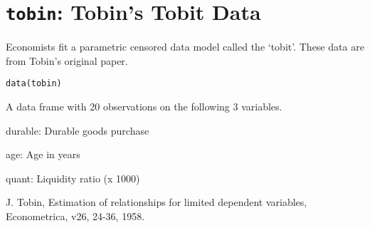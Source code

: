  \section{{\tt tobin}: Tobin's Tobit Data}\label{ss:tobin}
\begin{Description}\relax
Economists fit a parametric censored data model called the
`tobit'. These data are from Tobin's original paper.
\end{Description}
\begin{Usage}
\begin{verbatim}data(tobin)\end{verbatim}
\end{Usage}
\begin{Format}\relax
A data frame with 20 observations on the following 3 variables.

durable: Durable goods purchase

age: Age in years

quant: Liquidity ratio (x 1000)
\end{Format}
\begin{Source}\relax
J. Tobin, Estimation of relationships for limited dependent
variables, Econometrica, v26, 24-36, 1958.
\end{Source}


